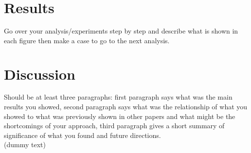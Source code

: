 \documentclass[9pt,twocolumn]{paper-template}
\begin{document}
\section*{Results}
Go over your analysis/experiments step by step and
describe what is shown in each figure then make a case
to go to the next analysis.\\



\section*{Discussion}
Should be at least three paragraphs: first paragraph says what
was the main results you showed, second paragraph says
what was the relationship of what you showed to what
was previously shown in other papers and what might
be the shortcomings of your approach, third paragraph
gives a short summary of significance of what you found
and future directions.\\

(dummy text)\lipsum[1]
\end{document}
